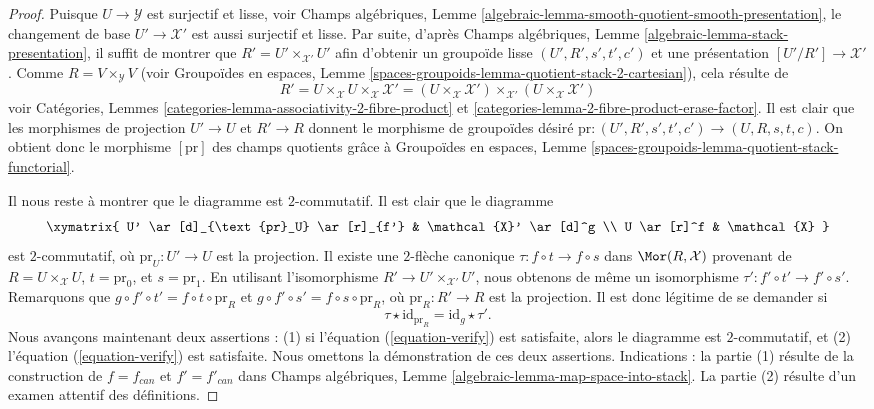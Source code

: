 \begin{proof}
Puisque $U \to \mathcal{Y}$ est surjectif et lisse, voir
Champs algébriques,
Lemme \ref{algebraic-lemma-smooth-quotient-smooth-presentation},
le changement de base $U' \to \mathcal{X}'$ est aussi surjectif et lisse.
Par suite, d'après
Champs algébriques,
Lemme \ref{algebraic-lemma-stack-presentation},
il suffit de montrer que $R' = U' \times_{\mathcal{X}'} U'$ afin
d'obtenir un groupoïde lisse $(U', R', s', t', c')$ et une présentation
$[U'/R'] \to \mathcal{X}'$.
Comme $R = V \times_\mathcal{Y} V$ (voir
Groupoïdes en espaces,
Lemme \ref{spaces-groupoids-lemma-quotient-stack-2-cartesian}),
cela résulte de
$$
R' =
U \times_\mathcal{X} U \times_\mathcal{X} \mathcal{X}' =
(U \times_\mathcal{X} \mathcal{X}')
\times_{\mathcal{X}'}
(U \times_\mathcal{X} \mathcal{X}')
$$
voir
Catégories, Lemmes \ref{categories-lemma-associativity-2-fibre-product} et
\ref{categories-lemma-2-fibre-product-erase-factor}.
Il est clair que les morphismes de projection $U' \to U$ et $R' \to R$ donnent le
morphisme de groupoïdes désiré
$\text{pr} : (U', R', s', t', c') \to (U, R, s, t, c)$.
On obtient donc le morphisme $[\text{pr}]$ des champs quotients grâce à
Groupoïdes en espaces,
Lemme \ref{spaces-groupoids-lemma-quotient-stack-functorial}.

\medskip\noindent
Il nous reste à montrer que le diagramme est $2$-commutatif.
Il est clair que le diagramme
$$
\xymatrix{
U' \ar[d]_{\text{pr}_U} \ar[r]_{f'} & \mathcal{X}' \ar[d]^g \\
U \ar[r]^f & \mathcal{X}
}
$$
est $2$-commutatif, où $\text{pr}_U : U' \to U$ est la projection.
Il existe une $2$-flèche canonique
$\tau : f \circ t \to f \circ s$ dans $\Mor(R, \mathcal{X})$
provenant de $R = U \times_\mathcal{X} U$, $t = \text{pr}_0$, et
$s = \text{pr}_1$. En utilisant l'isomorphisme
$R' \to U' \times_{\mathcal{X}'} U'$, nous obtenons de même un isomorphisme
$\tau' : f' \circ t' \to f' \circ s'$. Remarquons que
$g \circ f' \circ t' = f \circ t \circ \text{pr}_R$ et
$g \circ f' \circ s' = f \circ s \circ \text{pr}_R$, où
$\text{pr}_R : R' \to R$ est la projection. Il est donc légitime de se demander
si
\begin{equation}
\label{equation-verify}
\tau \star \text{id}_{\text{pr}_R} = \text{id}_g \star \tau'.
\end{equation}
Nous avançons maintenant deux assertions : (1) si l'équation (\ref{equation-verify}) est satisfaite,
alors le diagramme est $2$-commutatif, et (2) l'équation (\ref{equation-verify}) est satisfaite.
Nous omettons la démonstration de ces deux assertions. Indications : la partie (1) résulte de la
construction de $f = f_{can}$ et $f' = f'_{can}$ dans
Champs algébriques, Lemme \ref{algebraic-lemma-map-space-into-stack}.
La partie (2) résulte d'un examen attentif des définitions.
\end{proof}

